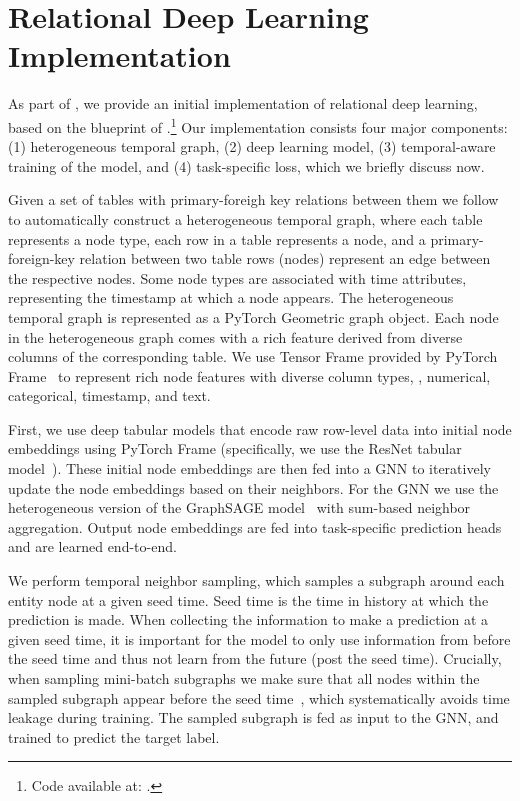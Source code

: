 \section{Relational Deep Learning Implementation}\label{sec:rdl_implementation}

As part of \relbench, we provide an initial implementation of relational deep learning, based on the blueprint of 
\cite{fey2023relational}.\footnote{Code available at: \relbenchgit.} Our implementation consists four major components: (1) heterogeneous temporal graph, (2) deep learning model, (3) temporal-aware training of the model, and (4) task-specific loss, which we briefly discuss now.

Given a set of tables with primary-foreigh key relations between them we follow \citet{fey2023relational} to automatically construct a heterogeneous temporal graph, where each table represents a node type, each row in a table represents a node, and a primary-foreign-key relation between two table rows (nodes) represent an edge between the respective nodes. Some node types are associated with time attributes, representing the timestamp at which a node appears. The heterogeneous temporal graph is represented as a PyTorch Geometric graph object.
Each node in the heterogeneous graph comes with a rich feature derived from diverse columns of the corresponding table. We use Tensor Frame provided by PyTorch Frame~\citep{hu2024pytorch} to represent rich node features with diverse column types, \eg, numerical, categorical, timestamp, and text.

First, we use deep tabular models that encode raw row-level data into initial node embeddings using PyTorch Frame \citep{hu2024pytorch} (specifically, we use the ResNet tabular model~\citep{gorishniy2021revisiting}). These initial node embeddings are then fed into a GNN to iteratively update the node embeddings based on their neighbors.
For the GNN we use the heterogeneous version of the GraphSAGE model~\citep{hamilton2017inductive,fey2019fast} with sum-based neighbor aggregation. Output node embeddings are fed into task-specific prediction heads and are learned end-to-end.

We perform temporal neighbor sampling, which samples 
a subgraph around each entity node at a given seed time. 
Seed time is the time in history at which the prediction is made. When collecting the information to make a prediction at a given seed time, it is important for the model to only use information from before the seed time and thus not learn from the future (post the seed time). Crucially, when sampling mini-batch subgraphs we make sure that all nodes within the sampled subgraph appear before the seed time~\citep{hamilton2017inductive,fey2023relational}, which systematically avoids time leakage during training.
The sampled subgraph is fed as input to the GNN, and trained to predict the target label.

